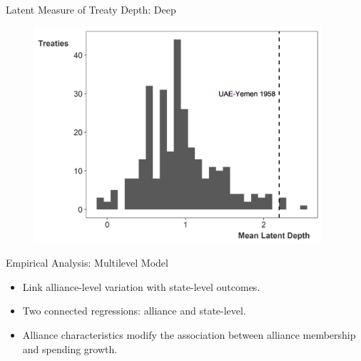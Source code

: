 \documentclass[12pt]{beamer}
\begin{document}

\begin{frame}{Latent Measure of Treaty Depth: Deep}

\begin{figure}[htbp]
	\centering
		\includegraphics[width=0.95\textwidth]{ld-hist-deep.png}
\end{figure}


\end{frame} 



\begin{frame}{Empirical Analysis: Multilevel Model}

\begin{itemize} 
\item Link alliance-level variation with state-level outcomes. 
\pause
\item Two connected regressions: alliance and state-level. 
\pause 
\item Alliance characteristics modify the association between alliance membership and spending growth.  
\end{itemize} 

\end{frame} 


\end{document}
